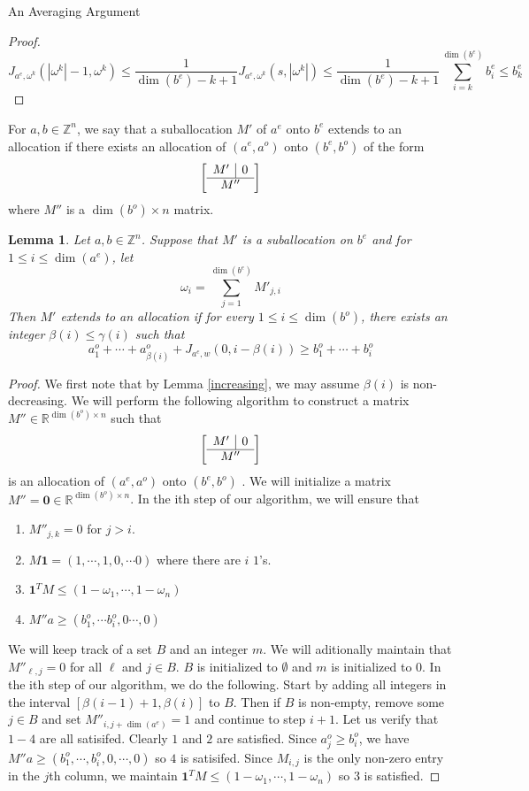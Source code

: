 \documentclass[11pt,a4paper]{article}
\newtheorem{lemma}[subsection]{Lemma}
\begin{document}
\begin{section}{An Averaging Argument}
\begin{proof}
\[
J_{a^e, \omega^k} (|\omega^k| - 1, \omega^k )\leq \frac{1}{\dim(b^e) - k + 1} J_{a^e, \omega^k} (s, |\omega^k| ) \leq \frac{1}{\dim(b^e) - k + 1} \sum_{i = k }^{\dim(b^e)} b^e_i \leq b^e_k
\]
\end{proof}
 For $a, b \in \mathbb{Z}^n$, we say that a suballocation $M'$ of $a^e$ onto $b^e$ extends to an allocation if there exists an allocation of $(a^e, a^o)$ onto $(b^e, b^o)$ of the form
\[
\left[
\begin{array}{c|c}
M' & 0 \\
\hline
\multicolumn{2}{c}{M''}
\end{array}
\right]
\]
where $M''$ is a $\dim(b^o) \times n$ matrix.
\begin{lemma}\label{extends} Let $a, b \in \mathbb{Z}^n$. Suppose that $M'$ is a suballocation on $b^e$ and for $1 \leq i \leq \dim(a^e)$, let
\[
\omega_i = \sum_{j = 1}^{\dim(b^e)} M'_{j, i}
\]
Then $M'$ extends to an allocation if for every $1 \leq i \leq \dim(b^o)$, there exists an integer $\beta(i) \leq \gamma(i)$ such that
\[
a^o_1 + \cdots + a^o_{\beta(i)} + J_{a^e, w} (0, i - \beta(i)) \geq b^o_1 + \cdots + b^o_i
\]
\end{lemma}
\begin{proof}
We first note that by Lemma \ref{increasing}, we may assume $\beta(i)$ is non-decreasing. We will perform the following algorithm to construct a matrix $M'' \in \mathbb{R}^{\dim(b^o) \times n}$ such that
\[
\left[
\begin{array}{c|c}
M' & 0 \\
\hline
\multicolumn{2}{c}{M''}
\end{array}
\right]
\]
is an allocation of $(a^e, a^o)$ onto $(b^e, b^o)$ . We will initialize a matrix $ M'' = \boldsymbol{0} \in \mathbb{R}^{\dim(b^o) \times n}$. In the ith step of our algorithm, we will ensure that
\begin{enumerate}
\item $M''_{j, k} = 0$ for $j > i$.
\item $M \boldsymbol{1} = (1, \cdots, 1, 0, \cdots 0)$ where there are $i$ $1$'s.
\item $\boldsymbol{1}^T M \leq ( 1- \omega_1, \cdots, 1 - \omega_n)$
\item $M'' a \geq (b^o_1, \cdots b^o_i, 0 \cdots, 0)$
\end{enumerate}
We will keep track of a set $B$ and an integer $m$. We will aditionally maintain that $M''_{\ell,j} = 0$ for all $\ell$ and $j \in B$. $B$ is initialized to $ \emptyset$ and $m$ is initialized to $0$. In the ith step of our algorithm, we do the following. Start by adding all integers in the interval $ [\beta(i - 1) + 1, \beta(i) ]$ to $B$. Then if $B$ is non-empty, remove some $j \in B$ and set $M''_{i, j + \dim(a^e)} = 1$ and continue to step $i + 1$. Let us verify that $1-4$ are all satisifed. Clearly $1$ and $2$ are satisfied. Since $a^o_{j} \geq b^o_i$, we have $M'' a \geq ( b^o_1, \cdots, b^o_i, 0, \cdots, 0)$ so $4$ is satisifed. Since $M_{i, j}$ is the only non-zero entry in the $j$th column, we maintain $ \boldsymbol{1}^T M \leq (1 - \omega_1, \cdots, 1 - \omega_n)$ so $3$ is satisfied.

\end{proof}
\end{section}
\end{document}
